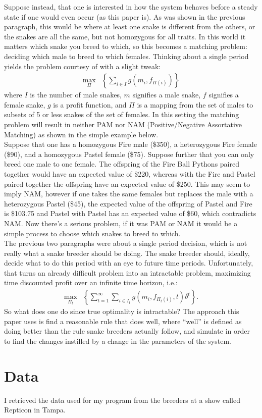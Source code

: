 \documentclass{article}
\begin{document}
	\indent Suppose instead, that one is interested in how the system behaves before a steady state if one would even occur (as this paper is). As was shown in the previous paragraph, this would be where at least one snake is different from the others, or the snakes are all the same, but not homozygous for all traits. In this world it matters which snake you breed to which, so this becomes a matching  problem: deciding which male to breed to which females. Thinking about a single period yields the problem courtesy of \cite{becker} with a slight tweak:
	\begin{align*}
		\max_{\Pi}&\left\{ \sum_{i\in I}g\left(m_i,f_{\Pi(i)}\right) \right\}
	\end{align*}
	where $I$ is the number of male snakes, $m$ signifies a male snake, $f$ signifies a female snake, $g$ is a profit function, and $\Pi$ is a mapping from the set of males to subsets of 5 or less snakes of the set of females. In this setting the matching problem will result in neither PAM nor NAM (Positive/Negative Assortative Matching) as shown in the simple example below.\\
	\indent Suppose that one has a homozygous Fire male (\$350), a heterozygous Fire female (\$90), and a homozygous Pastel female (\$75). Suppose further that you can only breed one male to one female. The offspring of the Fire Ball Pythons paired together would have an expected value of \$220, whereas with the Fire and Pastel paired together the offspring have an expected value of \$250. This may seem to imply NAM, however if one takes the same females but replaces the male with a heterozygous Pastel (\$45), the expected value of the offspring of Pastel and Fire is \$103.75 and Pastel with Pastel has an expected value of \$60, which contradicts NAM. Now there's a serious problem, if it was PAM or NAM it would be a simple process to choose which snakes to breed to which.\\
	\indent The previous two paragraphs were about a single period decision, which is not really what a snake breeder should be doing. The snake breeder should, ideally, decide what to do this period with an eye to future time periods. Unfortunately, that turns an already difficult problem into an intractable problem, maximizing time discounted profit over an infinite time horizon, i.e.:
	\begin{align*}
		\max_{\Pi_t}&\left\{ \sum_{t=1}^{\infty}\sum_{i\in I_t}g\left(m_i,f_{\Pi_t(i)},t\right)\delta^t \right\}.
	\end{align*}
	\indent So what does one do since true optimality is intractable? The approach this paper uses is find a reasonable rule that does well, where ``well'' is defined as doing better than the rule snake breeders actually follow, and simulate in order to find the changes instilled by a change in the parameters of the system.
	\section*{Data}
	\indent I retrieved the data used for my program from the breeders at a show called Repticon in Tampa.


\nocite{*}
\end{document}
